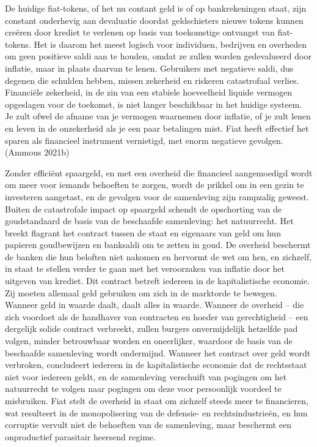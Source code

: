 \documentclass[
  a5paper,
  smalldemyvopaper,11pt,twoside,onecolumn,openright,extrafontsizes,
hidelinks]{memoir}
\begin{document}
De huidige fiat-tokens, of het nu contant geld is of op bankrekeningen
staat, zijn constant onderhevig aan devaluatie doordat geldschieters
nieuwe tokens kunnen creëren door krediet te verlenen op basis van
toekomstige ontvangst van fiat-tokens. Het is daarom het meest logisch
voor individuen, bedrijven en overheden om geen positieve saldi aan te
houden, omdat ze zullen worden gedevalueerd door inflatie, maar in
plaats daarvan te lenen. Gebruikers met negatieve saldi, dus degenen die
schulden hebben, missen zekerheid en riskeren catastrofaal verlies.
Financiële zekerheid, in de zin van een stabiele hoeveelheid liquide
vermogen opgeslagen voor de toekomst, is niet langer beschikbaar in het
huidige systeem. Je zult ofwel de afname van je vermogen waarnemen door
inflatie, of je zult lenen en leven in de onzekerheid als je een paar
betalingen mist. Fiat heeft effectief het sparen als financieel
instrument vernietigd, met enorm negatieve gevolgen. (Ammous 2021b)

Zonder efficiënt spaargeld, en met een overheid die financieel
aangemoedigd wordt om meer voor iemands behoeften te zorgen, wordt de
prikkel om in een gezin te investeren aangetast, en de gevolgen voor de
samenleving zijn rampzalig geweest. Buiten de catastrofale impact op
spaargeld schendt de opschorting van de goudstandaard de basis van de
beschaafde samenleving: het natuurrecht. Het breekt flagrant het
contract tussen de staat en eigenaars van geld om hun papieren
goudbewijzen en banksaldi om te zetten in goud. De overheid beschermt de
banken die hun beloften niet nakomen en hervormt de wet om hen, en
zichzelf, in staat te stellen verder te gaan met het veroorzaken van
inflatie door het uitgeven van krediet. Dit contract betreft iedereen in
de kapitalistische economie. Zij moeten allemaal geld gebruiken om zich
in de marktorde te bewegen. Wanneer geld in waarde daalt, daalt alles in
waarde. Wanneer de overheid -- die zich voordoet als de handhaver van
contracten en hoeder van gerechtigheid -- een dergelijk solide contract
verbreekt, zullen burgers onvermijdelijk hetzelfde pad volgen, minder
betrouwbaar worden en oneerlijker, waardoor de basis van de beschaafde
samenleving wordt ondermijnd. Wanneer het contract over geld wordt
verbroken, concludeert iedereen in de kapitalistische economie dat de
rechtsstaat niet voor iedereen geldt, en de samenleving verschuift van
pogingen om het natuurrecht te volgen naar pogingen om deze voor
persoonlijk voordeel te misbruiken. Fiat stelt de overheid in staat om
zichzelf steeds meer te financieren, wat resulteert in de monopolisering
van de defensie- en rechtsindustrieën, en hun corruptie vervult niet de
behoeften van de samenleving, maar beschermt een onproductief parasitair
heersend regime.
\end{document}

